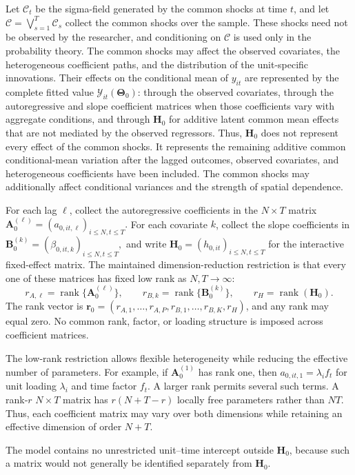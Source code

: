\documentclass[11pt]{article}
\numberwithin{equation}{section}
\theoremstyle{remark}
\newcommand{\rank}{\operatorname{rank}}
\newcommand{\br}{\bm r}
\newcommand{\bA}{\bm A}
\newcommand{\bB}{\bm B}
\newcommand{\bH}{\bm H}
\newcommand{\bTheta}{\bm\Theta}
\begin{document}
Let $\mathscr C_t$ be the sigma-field generated by the common shocks at time $t$, and let
$
\mathscr C=\bigvee_{s=1}^{T}\mathscr C_s
$
collect the common shocks over the sample. These shocks need not be observed by the researcher, and conditioning on $\mathscr C$ is used only in the probability theory. The common shocks may affect the observed covariates, the heterogeneous coefficient paths, and the distribution of the unit-specific innovations. Their effects on the conditional mean of $y_{it}$ are represented by the complete fitted value $\mathcal Y_{it}(\bTheta_0)$: through the observed covariates, through the autoregressive and slope coefficient matrices when those coefficients vary with aggregate conditions, and through $\bH_0$ for additive latent common mean effects that are not mediated by the observed regressors. Thus, $\bH_0$ does not represent every effect of the common shocks. It represents the remaining additive common conditional-mean variation after the lagged outcomes, observed covariates, and heterogeneous coefficients have been included. The common shocks may additionally affect conditional variances and the strength of spatial dependence.

For each lag $\ell$, collect the autoregressive coefficients in the $N\times T$ matrix
$
\bA_0^{(\ell)}=(a_{0,it,\ell})_{i\le N,t\le T}.
$
For each covariate $k$, collect the slope coefficients in
$
\bB_0^{(k)}=(\beta_{0,it,k})_{i\le N,t\le T},
$
and write $\bH_0=(h_{0,it})_{i\le N,t\le T}$ for the interactive fixed-effect matrix. The maintained dimension-reduction restriction is that every one of these matrices has fixed low rank as $N,T\to\infty$:
$$
r_{A,\ell}=\rank\{\bA_0^{(\ell)}\},
\qquad
r_{B,k}=\rank\{\bB_0^{(k)}\},
\qquad
r_H=\rank(\bH_0).
$$
The rank vector is $\br_0=(r_{A,1},\ldots,r_{A,P},r_{B,1},\ldots,r_{B,K},r_H)$, and any rank may equal zero. No common rank, factor, or loading structure is imposed across coefficient matrices.

The low-rank restriction allows flexible heterogeneity while reducing the effective number of parameters. For example, if $\bA_0^{(1)}$ has rank one, then $a_{0,it,1}=\lambda_i f_t$ for unit loading $\lambda_i$ and time factor $f_t$. A larger rank permits several such terms. A rank-$r$ $N\times T$ matrix has $r(N+T-r)$ locally free parameters rather than $NT$. Thus, each coefficient matrix may vary over both dimensions while retaining an effective dimension of order $N+T$.

The model contains no unrestricted unit--time intercept outside $\bH_0$, because such a matrix would not generally be identified separately from $\bH_0$.
\end{document}
